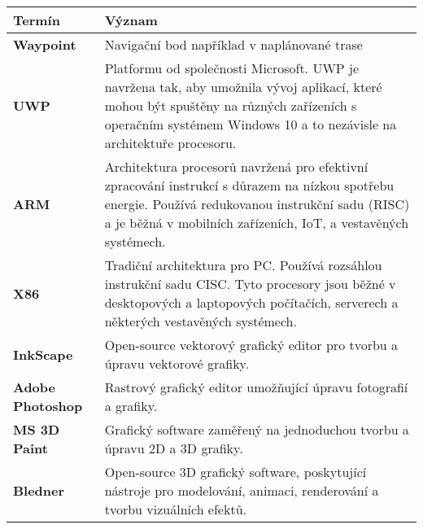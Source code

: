 \documentclass[zadani]{fitthesis} %
\begin{document}
    \chapter*{}
    \bgroup
    \def\arraystretch{1.6}
    \begin{tabular}{>{\bfseries}p{6.5em} p{11.8cm}   }
    \bfseries{Termín} & \bfseries{Význam} \\ 
    \hline
    Waypoint & Navigační bod například v naplánované trase \\
    UWP&Platformu od společnosti Microsoft. UWP je navržena tak, aby umožnila vývoj aplikací, které mohou být spuštěny na různých zařízeních s operačním systémem Windows 10 a to nezávisle na architektuře procesoru.\\
    ARM&Architektura procesorů navržená pro efektivní zpracování instrukcí s důrazem na nízkou spotřebu energie. Používá redukovanou instrukční sadu (RISC) a je běžná v mobilních zařízeních, IoT, a vestavěných systémech.\\
    X86& Tradiční architektura pro PC. Používá rozsáhlou instrukční sadu CISC. Tyto procesory jsou běžné v desktopových a laptopových počítačích, serverech a některých vestavěných systémech.\\
    InkScape & Open-source vektorový grafický editor pro tvorbu a úpravu vektorové grafiky.\\
    Adobe Photoshop&Rastrový grafický editor umožňující úpravu fotografií a grafiky.\\
    MS 3D Paint& Grafický software  zaměřený na jednoduchou tvorbu a úpravu 2D a 3D grafiky.\\
    Bledner &Open-source 3D grafický software, poskytující nástroje pro modelování, animaci, renderování a tvorbu vizuálních efektů. \\
    \end{tabular}
    \egroup


    
  \ifczech
    \renewcommand\listfigurename{Seznam obrázků}
  \fi
  \ifslovak
    \renewcommand\listfigurename{Zoznam obrázkov}
  \fi
  {\hypersetup{hidelinks}\listoffigures}
  
  \ifczech
    \renewcommand\listtablename{Seznam tabulek}
  \fi
  \ifslovak
    \renewcommand\listtablename{Zoznam tabuliek}
  \fi
\end{document}
